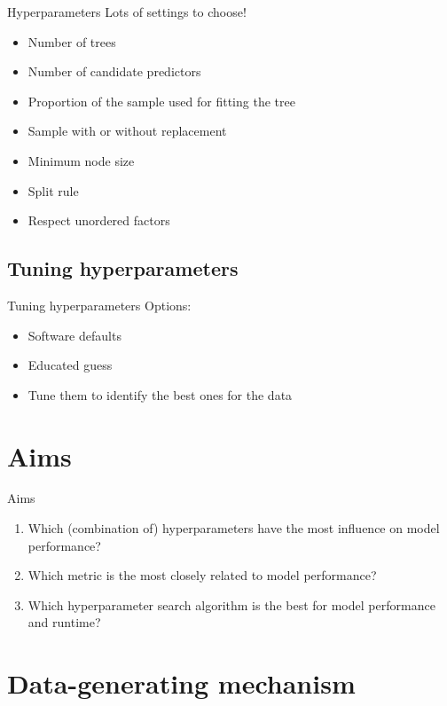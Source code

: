 \documentclass[aspectratio=169]{beamer} %
\begin{document}
\begin{frame}{Hyperparameters}
    Lots of settings to choose!\begin{itemize}
        \item Number of trees
        \item Number of candidate predictors
        \item Proportion of the sample used for fitting the tree
        \item Sample with or without replacement
        \item Minimum node size
        \item Split rule
        \item Respect unordered factors
    \end{itemize}
\end{frame}

\subsection{Tuning hyperparameters}

\begin{frame}{Tuning hyperparameters}
    Options:
    \begin{itemize}
        \item Software defaults
        \item Educated guess
        \item Tune them to identify the best ones for the data
    \end{itemize}
\end{frame}

\section{Aims}

\begin{frame}{Aims}
    \begin{enumerate}
        \item Which (combination of) hyperparameters have the most influence on model performance?
        \item Which metric is the most closely related to model performance?
        \item Which hyperparameter search algorithm is the best for model performance and runtime?
    \end{enumerate}
\end{frame}

\section{Data-generating mechanism}
\end{document}
